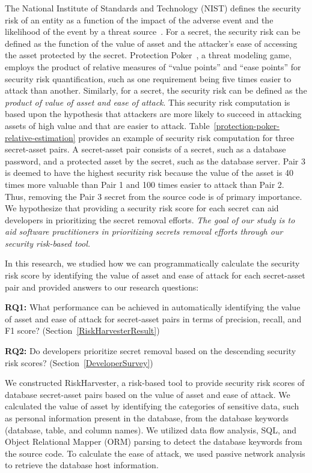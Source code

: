 The National Institute of Standards and Technology (NIST) defines the security risk of an entity as a function of the impact of the adverse event and the likelihood of the event by a threat source~\cite{nist-risk}. For a secret, the security risk can be defined as the function of the value of asset and the attacker's ease of accessing the asset protected by the secret. Protection Poker~\cite{williams2010protection}, a threat modeling game, employs the product of relative measures of ``value points'' and ``ease points'' for security risk quantification, such as one requirement being five times easier to attack than another. Similarly, for a secret, the security risk can be defined as the \textit{product of value of asset and ease of attack}. This security risk computation is based upon the hypothesis that attackers are more likely to succeed in attacking assets of high value and that are easier to attack. Table~\ref{protection-poker-relative-estimation} provides an example of security risk computation for three secret-asset pairs. A secret-asset pair consists of a secret, such as a database password, and a protected asset by the secret, such as the database server. Pair 3 is deemed to have the highest security risk because the value of the asset is 40 times more valuable than Pair 1 and 100 times easier to attack than Pair 2. Thus, removing the Pair 3 secret from the source code is of primary importance. We hypothesize that providing a security risk score for each secret can aid developers in prioritizing the secret removal efforts. \textit{The goal of our study is to aid software practitioners in prioritizing secrets removal efforts through our security risk-based tool.}



In this research, we studied how we can programmatically calculate the security risk score by identifying the value of asset and ease of attack for each secret-asset pair and provided answers to our research questions:

\textbf{RQ1:} What performance can be achieved in automatically identifying the value of asset and ease of attack for secret-asset pairs in terms of precision, recall, and F1 score? (Section~\ref{RiskHarvesterResult})

\textbf{RQ2:} Do developers prioritize secret removal based on the descending security risk scores? (Section~\ref{DeveloperSurvey})

We constructed RiskHarvester, a risk-based tool to provide security risk scores of database secret-asset pairs based on the value of asset and ease of attack. We calculated the value of asset by identifying the categories of sensitive data, such as personal information present in the database, from the database keywords (database, table, and column names). We utilized data flow analysis, SQL, and Object Relational Mapper (ORM) parsing to detect the database keywords from the source code. To calculate the ease of attack, we used passive network analysis to retrieve the database host information.

